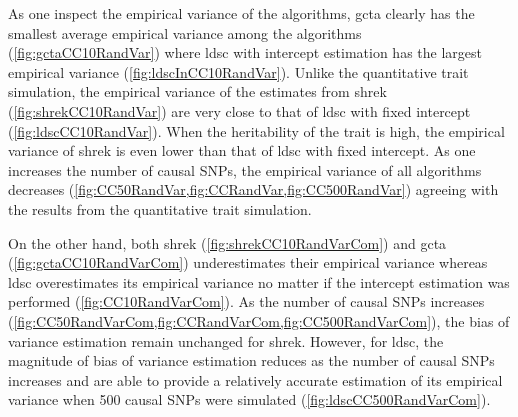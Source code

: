 \documentclass[12pt]{scrbook}
\begin{document}
As one inspect the empirical variance of the algorithms, \gls{gcta} clearly has the smallest average empirical variance among the algorithms (\cref{fig:gctaCC10RandVar}) where \gls{ldsc} with intercept estimation has the largest empirical variance (\cref{fig:ldscInCC10RandVar}). 
Unlike the quantitative trait simulation, the empirical variance of the estimates from \gls{shrek} (\cref{fig:shrekCC10RandVar}) are very close to that of \gls{ldsc} with fixed intercept (\cref{fig:ldscCC10RandVar}).
When the heritability of the trait is high, the empirical variance of \gls{shrek} is even lower than that of \gls{ldsc} with fixed intercept. 
As one increases the number of causal \glspl{SNP}, the empirical variance of all algorithms decreases (\cref{fig:CC50RandVar,fig:CCRandVar,fig:CC500RandVar}) agreeing with the results from the quantitative trait simulation.

On the other hand, both \gls{shrek} (\cref{fig:shrekCC10RandVarCom}) and \gls{gcta} (\cref{fig:gctaCC10RandVarCom}) underestimates their empirical variance whereas \gls{ldsc} overestimates its empirical variance no matter if the intercept estimation was performed  (\cref{fig:CC10RandVarCom}).
As the number of causal \glspl{SNP} increases (\cref{fig:CC50RandVarCom,fig:CCRandVarCom,fig:CC500RandVarCom}), the bias of variance estimation remain unchanged for \gls{shrek}. 
However, for \gls{ldsc}, the magnitude of bias of variance estimation reduces as the number of causal \glspl{SNP} increases and are able to provide a relatively accurate estimation of its empirical variance when 500 causal \glspl{SNP} were simulated (\cref{fig:ldscCC500RandVarCom}).
\end{document}
